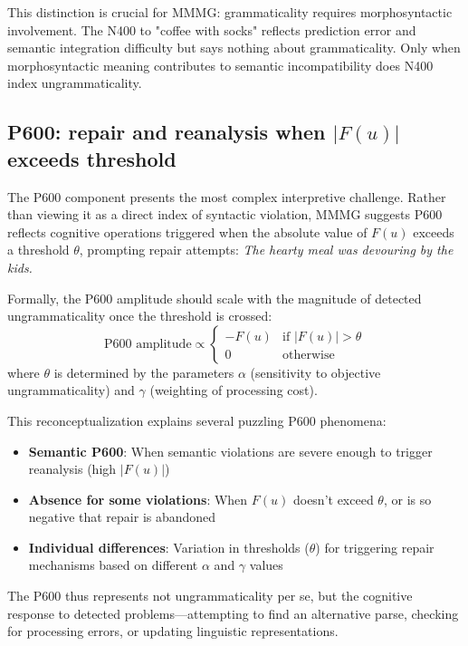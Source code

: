 \documentclass[12pt,letterpaper]{article}
\begin{document}
This distinction is crucial for MMMG: grammaticality requires morphosyntactic involvement. The N400 to "coffee with socks" reflects prediction error and semantic integration difficulty but says nothing about grammaticality. Only when morphosyntactic meaning contributes to semantic incompatibility does N400 index ungrammaticality.

\subsection{P600: repair and reanalysis when
  \texorpdfstring{$\lvert F(u)\rvert$}{|F(u)|} exceeds threshold}

The P600 component presents the most complex interpretive challenge. Rather than viewing it as a direct index of syntactic violation, MMMG suggests P600 reflects cognitive operations triggered when the absolute value of $F(u)$ exceeds a threshold $\theta$, prompting repair attempts:
\ea\label{ex:P600}
\textit{The hearty meal was devouring by the kids.}
\z

Formally, the P600 amplitude should scale with the magnitude of detected ungrammaticality once the threshold is crossed:
\[
\text{P600 amplitude} \propto 
\begin{cases}
-F(u) & \text{if } |F(u)| > \theta \\
0 & \text{otherwise}
\end{cases}
\]
where $\theta$ is determined by the parameters $\alpha$ (sensitivity to objective ungrammaticality) and $\gamma$ (weighting of processing cost).

This reconceptualization explains several puzzling P600 phenomena:

\begin{itemize}
    \item \textbf{Semantic P600}: When semantic violations are severe enough to trigger reanalysis (high $|F(u)|$)
    \item \textbf{Absence for some violations}: When $F(u)$ doesn't exceed $\theta$, or is so negative that repair is abandoned
    \item \textbf{Individual differences}: Variation in thresholds ($\theta$) for triggering repair mechanisms based on different $\alpha$ and $\gamma$ values
\end{itemize}
The P600 thus represents not ungrammaticality per se, but the cognitive response to detected problems---attempting to find an alternative parse, checking for processing errors, or updating linguistic representations.
\end{document}
